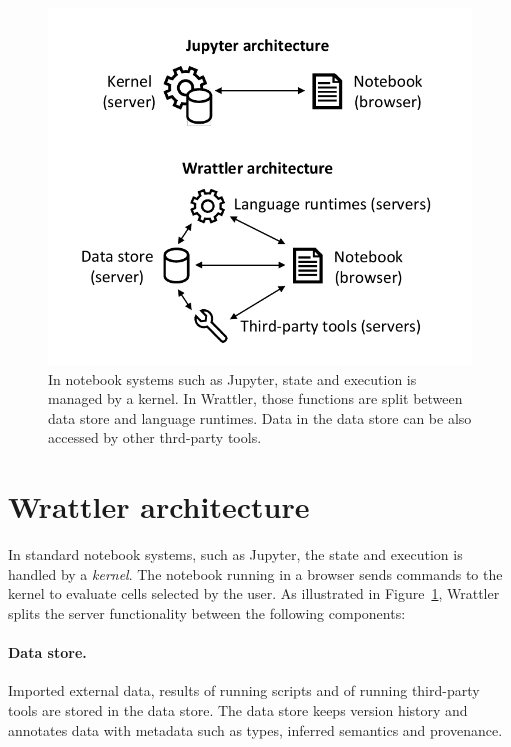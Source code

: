 \documentclass[sigplan]{acmart}\settopmatter{printfolios=true,printccs=false,printacmref=false}
\begin{document}
\begin{figure}[b]
\vspace{-1em}
\includegraphics[scale=0.6]{diagram.pdf}
\vspace{-0.5em}
\caption{\small{In notebook systems such as Jupyter, state and execution is managed by a kernel. In
  Wrattler, those functions are split between data store and language runtimes. Data in the data store
  can be also accessed by other thrd-party tools.}}
\label{fig:arch}
\end{figure}

\section{Wrattler architecture}
\label{sec:arch}

In standard notebook systems, such as Jupyter, the state and execution is handled by a 
\emph{kernel}. The notebook running in a browser sends commands to the kernel to evaluate 
cells selected by the user. As illustrated in Figure~\ref{fig:arch}, Wrattler splits the 
server functionality between the following components:

\paragraph{Data store.} Imported external data, results of running scripts and of 
running third-party tools are stored in the data store. The data store keeps version history
and annotates data with metadata such as types, inferred semantics and provenance.
\end{document}
